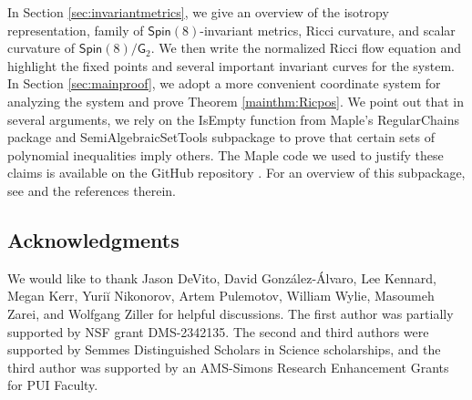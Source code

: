 \documentclass{amsart}
\numberwithin{equation}{section}
\newtheorem{theorem}[equation]{Theorem}
\theoremstyle{plain}
\theoremstyle{definition}
\theoremstyle{remark}
\numberwithin{table}{section}
\newcommand{\gG}{\mathsf{G}}
\newcommand{\SO}{\mathsf{SO}}
\newcommand{\Spin}{\mathsf{Spin}}
\newcommand{\so}{\mathfrak{so}}
\begin{document}
In Section \ref{sec:invariantmetrics}, we give an overview of the isotropy representation, family of $\Spin(8)$-invariant metrics, Ricci curvature, and scalar curvature of $\Spin(8)/\gG_2$.
We then write the normalized Ricci flow equation and highlight the fixed points and several important invariant curves for the system.
In Section \ref{sec:mainproof}, we adopt a more convenient coordinate system for analyzing the system and prove Theorem \ref{mainthm:Ricpos}.
We point out that in several arguments, we rely on the IsEmpty function from Maple’s RegularChains package and SemiAlgebraicSetTools subpackage to prove that certain sets of polynomial inequalities imply others.
The Maple code we used to justify these claims is available on the GitHub repository \cite{GitHub}.
For an overview of this subpackage, see \cite{MapleSite} and the references therein.

\subsection{Acknowledgments}

We would like to thank Jason DeVito, David Gonz\'alez-\'Alvaro, Lee Kennard, Megan Kerr, Yuri\u{i} Nikonorov, Artem Pulemotov, William Wylie, Masoumeh Zarei, and Wolfgang Ziller for helpful discussions. The first author was partially supported by NSF grant DMS-2342135. The second and third authors were supported by Semmes Distinguished Scholars in Science scholarships, and the third author was supported by an AMS-Simons Research Enhancement Grants for PUI Faculty.

    
    
\end{document}
